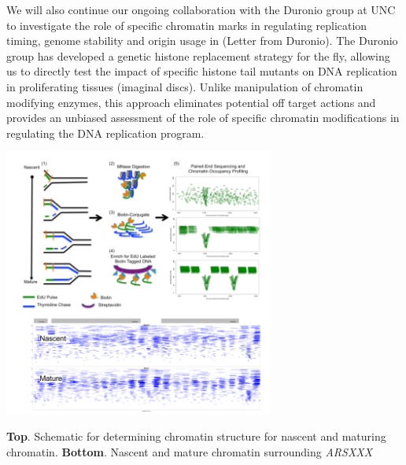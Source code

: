 We will also continue our ongoing collaboration with the Duronio group at UNC to investigate the role of specific chromatin marks in regulating replication timing, genome stability and origin usage in \dros\citep{Li2016-fi}(Letter from Duronio).  The Duronio group has developed a genetic histone replacement strategy for the fly\citep{McKay2015-nn}, allowing us to directly test the impact of specific histone tail mutants on DNA replication in proliferating tissues (\eg imaginal discs).  Unlike manipulation of chromatin modifying enzymes, this approach eliminates potential off target actions and provides an unbiased assessment of the role of specific chromatin modifications in regulating the DNA replication program.
\begin{floatingfigure}[l]{3.5in}
\vspace{-8mm}
\begin{center}
\includegraphics[width=3.5in]{r35_figures/chromatin_maturation_mpg_3.png}
\end{center}
\vspace{1mm}
\caption{{\bfseries \sffamily Top}. Schematic for determining chromatin structure for nascent and maturing chromatin. {\bfseries \sffamily Bottom}. Nascent and mature chromatin surrounding \textit{ARSXXX}}%
\end{floatingfigure}


 


